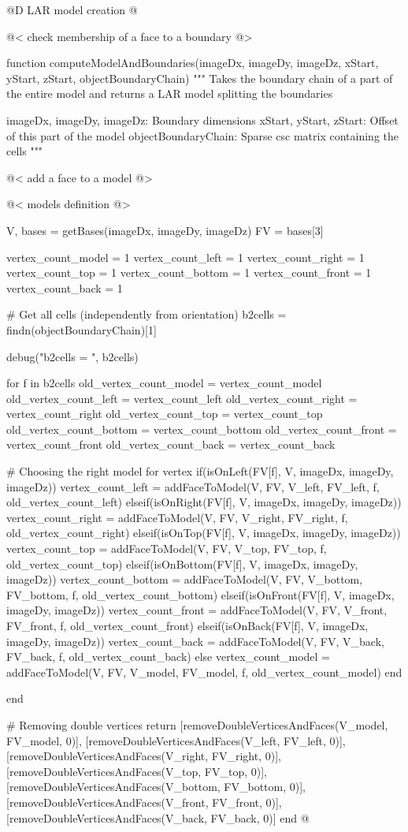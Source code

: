 \documentclass[11pt,oneside]{article}	%
\begin{document}
@D LAR model creation
@{@< check membership of a face to a boundary @>

function computeModelAndBoundaries(imageDx, imageDy, imageDz,
                      xStart, yStart, zStart,
                      objectBoundaryChain)
  """
  Takes the boundary chain of a part of the entire model
  and returns a LAR model splitting the boundaries

  imageDx, imageDy, imageDz: Boundary dimensions
  xStart, yStart, zStart: Offset of this part of the model
  objectBoundaryChain: Sparse csc matrix containing the cells
  """

  @< add a face to a model @>
  
  @< models definition @>

  V, bases = getBases(imageDx, imageDy, imageDz)
  FV = bases[3]

  vertex_count_model = 1
  vertex_count_left = 1
  vertex_count_right = 1
  vertex_count_top = 1
  vertex_count_bottom = 1
  vertex_count_front = 1
  vertex_count_back = 1

  # Get all cells (independently from orientation)
  b2cells = findn(objectBoundaryChain)[1]

  debug("b2cells = ", b2cells)

  for f in b2cells
    old_vertex_count_model = vertex_count_model
    old_vertex_count_left = vertex_count_left
    old_vertex_count_right = vertex_count_right
    old_vertex_count_top = vertex_count_top
    old_vertex_count_bottom = vertex_count_bottom
    old_vertex_count_front = vertex_count_front
    old_vertex_count_back = vertex_count_back

    # Choosing the right model for vertex
    if(isOnLeft(FV[f], V, imageDx, imageDy, imageDz))
      vertex_count_left = addFaceToModel(V, FV, V_left, FV_left,
				  f, old_vertex_count_left)
    elseif(isOnRight(FV[f], V, imageDx, imageDy, imageDz))
      vertex_count_right = addFaceToModel(V, FV, V_right, FV_right,
				  f, old_vertex_count_right)
    elseif(isOnTop(FV[f], V, imageDx, imageDy, imageDz))
      vertex_count_top = addFaceToModel(V, FV, V_top, FV_top,
				  f, old_vertex_count_top)
    elseif(isOnBottom(FV[f], V, imageDx, imageDy, imageDz))
      vertex_count_bottom = addFaceToModel(V, FV, V_bottom, FV_bottom,
				  f, old_vertex_count_bottom)
    elseif(isOnFront(FV[f], V, imageDx, imageDy, imageDz))
      vertex_count_front = addFaceToModel(V, FV, V_front, FV_front,
				  f, old_vertex_count_front)
    elseif(isOnBack(FV[f], V, imageDx, imageDy, imageDz))
      vertex_count_back = addFaceToModel(V, FV, V_back, FV_back,
				  f, old_vertex_count_back)
    else
      vertex_count_model = addFaceToModel(V, FV, V_model, FV_model,
				  f, old_vertex_count_model)
    end

  end

  # Removing double vertices
  return [removeDoubleVerticesAndFaces(V_model, FV_model, 0)],
  [removeDoubleVerticesAndFaces(V_left, FV_left, 0)],
  [removeDoubleVerticesAndFaces(V_right, FV_right, 0)],
  [removeDoubleVerticesAndFaces(V_top, FV_top, 0)],
  [removeDoubleVerticesAndFaces(V_bottom, FV_bottom, 0)],
  [removeDoubleVerticesAndFaces(V_front, FV_front, 0)],
  [removeDoubleVerticesAndFaces(V_back, FV_back, 0)]
end @}
\end{document}
